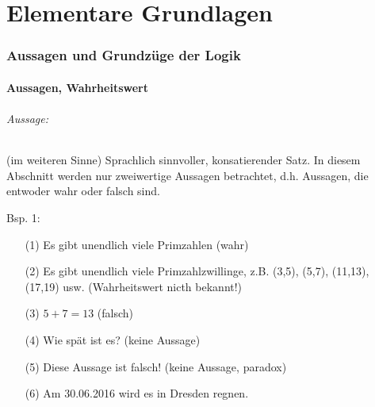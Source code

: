 





\maketitle
\newpage
\tableofcontents
\newpage


\part{Elementare Grundlagen}

\section{Aussagen und Grundzüge der Logik}

\subsection{Aussagen, Wahrheitswert}

\paragraph{Aussage:} (im weiteren Sinne) Sprachlich sinnvoller, konsatierender Satz. In diesem Abschnitt werden nur zweiwertige Aussagen betrachtet, d.h. Aussagen, die entwoder wahr oder falsch sind.

\subparagraph{Bsp. 1:} 
\begin{itemize}
\item[(1)] Es gibt unendlich viele Primzahlen (wahr)
\item[(2)] Es gibt unendlich viele Primzahlzwillinge, z.B. (3,5), (5,7), (11,13), (17,19) usw. (Wahrheitswert nicth bekannt!)
\item[(3)] $5+7=13$ (falsch)
\item[(4)] Wie spät ist es? (keine Aussage)
\item[(5)] Diese Aussage ist falsch! (keine Aussage, paradox)
\item[(6)] Am 30.06.2016 wird es in Dresden regnen.
\end{itemize}


